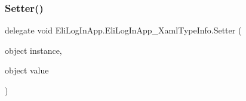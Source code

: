 \subsubsection{\texorpdfstring{Setter()}{Setter()}}
{\footnotesize\ttfamily delegate void Eli\+Log\+In\+App.\+Eli\+Log\+In\+App\+\_\+\+Xaml\+Type\+Info.\+Setter (\begin{DoxyParamCaption}\item[{object}]{instance,  }\item[{object}]{value }\end{DoxyParamCaption})\hspace{0.3cm}{\ttfamily [package]}}

